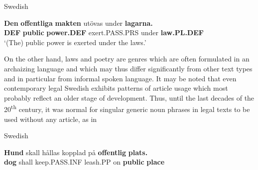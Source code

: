 
\item 

Swedish



 \ea\label{}
\gll \textbf{Den}\textbf{  offentliga}\textbf{  makten} utövas  under  \textbf{lagarna.}\\


\textbf{DEF} \textbf{public} \textbf{power.DEF} exert.PASS.PRS  under  \textbf{law.PL.DEF}\\

\glt  ‘(The) public power is exerted under the laws.’

\z

On the other hand, laws and poetry are genres which are often formulated in an archaizing language and which may thus differ significantly from other text types and in particular from informal spoken language. It may be noted that even contemporary legal Swedish exhibits patterns of article usage which most probably reflect an older stage of development. Thus, until the last decades of the 20\textsuperscript{th} century, it was normal for singular generic noun phrases in legal texts to be used without any article, as in 


\item 

Swedish



 \ea\label{}
\gll \textbf{Hund} skall  hållas  kopplad  på  \textbf{offentlig}\textbf{  plats.}\\


\textbf{dog} shall  keep.PASS.INF  leash.PP  on  \textbf{public} \textbf{place}\\


